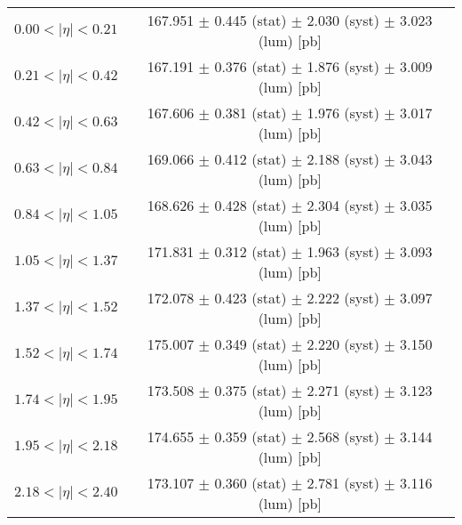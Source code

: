 \begin{tabular}{lc}
\hline
$0.00 < |\eta| <0.21$          & 167.951 $\pm$ 0.445 (stat) $\pm$ 2.030 (syst) $\pm$ 3.023 (lum) [pb]  \\
$0.21 < |\eta| <0.42$          & 167.191 $\pm$ 0.376 (stat) $\pm$ 1.876 (syst) $\pm$ 3.009 (lum) [pb]  \\
$0.42 < |\eta| <0.63$          & 167.606 $\pm$ 0.381 (stat) $\pm$ 1.976 (syst) $\pm$ 3.017 (lum) [pb]  \\
$0.63 < |\eta| <0.84$          & 169.066 $\pm$ 0.412 (stat) $\pm$ 2.188 (syst) $\pm$ 3.043 (lum) [pb]  \\
$0.84 < |\eta| <1.05$          & 168.626 $\pm$ 0.428 (stat) $\pm$ 2.304 (syst) $\pm$ 3.035 (lum) [pb]  \\
$1.05 < |\eta| <1.37$          & 171.831 $\pm$ 0.312 (stat) $\pm$ 1.963 (syst) $\pm$ 3.093 (lum) [pb]  \\
$1.37 < |\eta| <1.52$          & 172.078 $\pm$ 0.423 (stat) $\pm$ 2.222 (syst) $\pm$ 3.097 (lum) [pb]  \\
$1.52 < |\eta| <1.74$          & 175.007 $\pm$ 0.349 (stat) $\pm$ 2.220 (syst) $\pm$ 3.150 (lum) [pb]  \\
$1.74 < |\eta| <1.95$          & 173.508 $\pm$ 0.375 (stat) $\pm$ 2.271 (syst) $\pm$ 3.123 (lum) [pb]  \\
$1.95 < |\eta| <2.18$          & 174.655 $\pm$ 0.359 (stat) $\pm$ 2.568 (syst) $\pm$ 3.144 (lum) [pb]  \\
$2.18 < |\eta| <2.40$          & 173.107 $\pm$ 0.360 (stat) $\pm$ 2.781 (syst) $\pm$ 3.116 (lum) [pb]  \\
\hline
\end{tabular}

